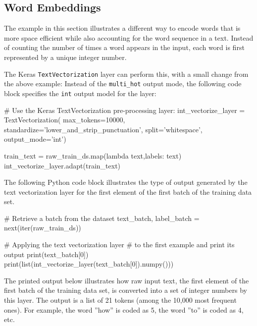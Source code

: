 \begin{advanced}

\subsection[Word Embedding]{Word Embeddings}

\end{advanced}

\begin{withcode}
The example in this section illustrates a different way to encode words that is more space efficient while also accounting for the word sequence in a text. Instead of counting the number of times a word appears in the input, each word is first represented by a unique integer number. 

The Keras \texttt{TextVectorization} layer can perform this, with a small change from the above example: Instead of the \texttt{multi\_hot} output mode, the following code block specifies the \texttt{int} output model for the layer:

\begin{pythoncode}
# Use the Keras TextVectorization pre-processing layer:
int_vectorize_layer = TextVectorization(
    max_tokens=10000,
    standardize='lower_and_strip_punctuation',
    split='whitespace',
    output_mode='int')
    
train_text = raw_train_ds.map(lambda text,labels: text)
int_vectorize_layer.adapt(train_text)
\end{pythoncode}

The following Python code block illustrates the type of output generated by the text vectorization layer for the first element of the first batch of the training data set.

\begin{pythoncode}
# Retrieve a batch from the dataset
text_batch, label_batch = next(iter(raw_train_ds))

# Applying the text vectorization layer
# to the first example and print its output
print(text_batch[0])
print(list(int_vectorize_layer(text_batch[0]).numpy()))
\end{pythoncode}

The printed output below illustrates how raw input text, the first element of the first batch of the training data set, is converted into a set of integer numbers by this layer. The output is a list of 21 tokens (among the 10,000 most frequent ones). For example, the word ''how'' is coded as 5, the word ''to'' is coded as 4, etc.


\end{withcode}
